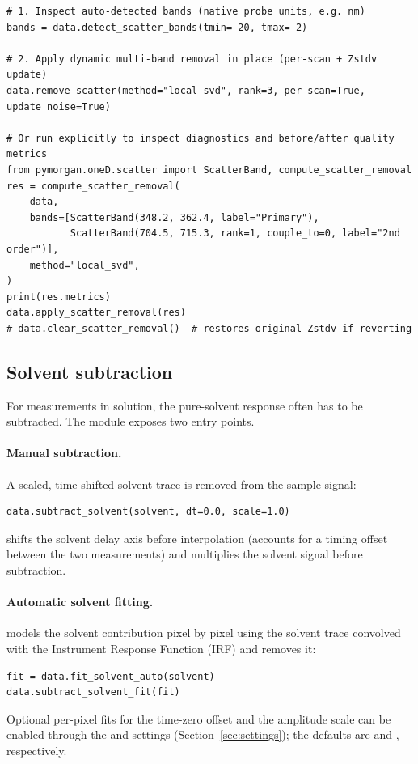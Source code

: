 \begin{lstlisting}
# 1. Inspect auto-detected bands (native probe units, e.g. nm)
bands = data.detect_scatter_bands(tmin=-20, tmax=-2)

# 2. Apply dynamic multi-band removal in place (per-scan + Zstdv update)
data.remove_scatter(method="local_svd", rank=3, per_scan=True, update_noise=True)

# Or run explicitly to inspect diagnostics and before/after quality metrics
from pymorgan.oneD.scatter import ScatterBand, compute_scatter_removal
res = compute_scatter_removal(
    data,
    bands=[ScatterBand(348.2, 362.4, label="Primary"),
           ScatterBand(704.5, 715.3, rank=1, couple_to=0, label="2nd order")],
    method="local_svd",
)
print(res.metrics)
data.apply_scatter_removal(res)
# data.clear_scatter_removal()  # restores original Zstdv if reverting
\end{lstlisting}

\subsection{Solvent subtraction}\label{sec:solvent}
For measurements in solution, the pure-solvent response often has to be
subtracted. The module exposes two entry points.

\paragraph{Manual subtraction.} A scaled, time-shifted solvent trace is removed
from the sample signal:
\begin{lstlisting}
data.subtract_solvent(solvent, dt=0.0, scale=1.0)
\end{lstlisting}
 shifts the solvent delay axis before interpolation (accounts for a
timing offset between the two measurements) and  multiplies the
solvent signal before subtraction.

\paragraph{Automatic solvent fitting.}  models the
solvent contribution pixel by pixel using the solvent trace convolved with the
Instrument Response Function (IRF) and removes it:
\begin{lstlisting}
fit = data.fit_solvent_auto(solvent)
data.subtract_solvent_fit(fit)
\end{lstlisting}
Optional per-pixel fits for the time-zero offset and the amplitude scale can be
enabled through the  and  settings
(Section~\ref{sec:settings}); the defaults are  and ,
respectively.

